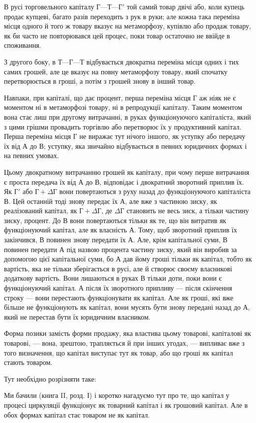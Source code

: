 
В русі торговельного капіталу $Г — Т — Г'$ той самий товар
двічі або, коли купець продає купцеві, багато разів переходить
з рук в руки; але кожна така переміна місця одного й того ж
товару вказує на метаморфозу, купівлю або продаж товару,
як би часто не повторювався цей процес, поки товар остаточно
не ввійде в споживання.

З другого боку, в $Т — Г — Т$ відбувається двократна переміна
місця одних і тих самих грошей, але це вказує на повну
метаморфозу товару, який спочатку перетворюється в гроші,
а потім з грошей знову в інший товар.

Навпаки, при капіталі, що дає процент, перша переміна місця
$Г$ аж ніяк не є моментом ні в метаморфозі товару, ні в репродукції
капіталу. Таким моментом вона стає лиш при другому
витрачанні, в руках функціонуючого капіталіста, який з цими
грішми провадить торгівлю або перетворює їх у продуктивний
капітал. Перша переміна місця $Г$ не виражає тут нічого іншого,
як уступку або передачу їх від $А$ до $В$; уступку, яка звичайно
відбувається в певних юридичних формах і на певних умовах.

Цьому двократному витрачанню грошей як капіталу, при
чому перше витрачання є проста передача їх від $А$ до $В$, відповідає
і двократний зворотний приплив їх. Як $Г'$ або $Г + ΔГ$ вони
повертаються з руху назад до функціонуючого капіталіста $В$. Цей останній тоді знову передає їх $А$, але вже з частиною
зиску, як реалізований капітал, як $Г + ΔГ$, де $ΔГ$ становить
не весь зиск, а тільки частину зиску, процент. До $В$ вони повертаються
тільки як те, що він витратив як функціонуючий
капітал, але як власність $А$. Тому, щоб зворотний приплив їх
закінчився, $В$ повинен знову передати їх $А$. Але, крім капітальної
суми, $В$ повинен передати $А$ під назвою процента частину
зиску, який він виробив за допомогою цієї капітальної суми,
бо $А$ дав йому гроші тільки як капітал, тобто як вартість, яка
не тільки зберігається в русі, але й створює своєму власникові
додаткову вартість. Вони лишаються в руках $В$ тільки доти,
поки вони є функціонуючий капітал. А після їх зворотного
припливу — після скінчення строку — вони перестають функціонувати
як капітал. Але як гроші, які вже більше не функціонують
як капітал, вони мусять бути знову передані назад до $А$,
який не перестав бути їх юридичним власником.

Форма позики замість форми продажу, яка властива цьому
товарові, капіталові як товарові, — вона, зрештою, трапляється
й при інших угодах, — випливає вже з того визначення, що
капітал виступає тут як товар, або що гроші як капітал стають
товаром.

Тут необхідно розрізняти таке:

Ми бачили (книга II, розд. І) і коротко нагадуємо тут про те,
що капітал у процесі циркуляції функціонує як товарний капітал
і як грошовий капітал. Але в обох формах капітал стає
товаром не як капітал.
